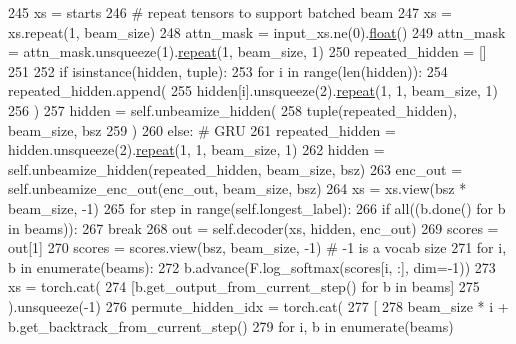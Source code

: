 \begin{DoxyCode}
245                 xs = starts
246                 \textcolor{comment}{# repeat tensors to support batched beam}
247                 xs = xs.repeat(1, beam\_size)
248                 attn\_mask = input\_xs.ne(0).\hyperlink{namespaceprojects_1_1controllable__dialogue_1_1make__control__dataset_aa2b7207688c641dbc094ab44eca27113}{float}()
249                 attn\_mask = attn\_mask.unsqueeze(1).\hyperlink{namespacerepeat}{repeat}(1, beam\_size, 1)
250                 repeated\_hidden = []
251 
252                 \textcolor{keywordflow}{if} isinstance(hidden, tuple):
253                     \textcolor{keywordflow}{for} i \textcolor{keywordflow}{in} range(len(hidden)):
254                         repeated\_hidden.append(
255                             hidden[i].unsqueeze(2).\hyperlink{namespacerepeat}{repeat}(1, 1, beam\_size, 1)
256                         )
257                     hidden = self.unbeamize\_hidden(
258                         tuple(repeated\_hidden), beam\_size, bsz
259                     )
260                 \textcolor{keywordflow}{else}:  \textcolor{comment}{# GRU}
261                     repeated\_hidden = hidden.unsqueeze(2).\hyperlink{namespacerepeat}{repeat}(1, 1, beam\_size, 1)
262                     hidden = self.unbeamize\_hidden(repeated\_hidden, beam\_size, bsz)
263                 enc\_out = self.unbeamize\_enc\_out(enc\_out, beam\_size, bsz)
264                 xs = xs.view(bsz * beam\_size, -1)
265                 \textcolor{keywordflow}{for} step \textcolor{keywordflow}{in} range(self.longest\_label):
266                     \textcolor{keywordflow}{if} all((b.done() \textcolor{keywordflow}{for} b \textcolor{keywordflow}{in} beams)):
267                         \textcolor{keywordflow}{break}
268                     out = self.decoder(xs, hidden, enc\_out)
269                     scores = out[1]
270                     scores = scores.view(bsz, beam\_size, -1)  \textcolor{comment}{# -1 is a vocab size}
271                     \textcolor{keywordflow}{for} i, b \textcolor{keywordflow}{in} enumerate(beams):
272                         b.advance(F.log\_softmax(scores[i, :], dim=-1))
273                     xs = torch.cat(
274                         [b.get\_output\_from\_current\_step() \textcolor{keywordflow}{for} b \textcolor{keywordflow}{in} beams]
275                     ).unsqueeze(-1)
276                     permute\_hidden\_idx = torch.cat(
277                         [
278                             beam\_size * i + b.get\_backtrack\_from\_current\_step()
279                             \textcolor{keywordflow}{for} i, b \textcolor{keywordflow}{in} enumerate(beams)

\end{DoxyCode}
